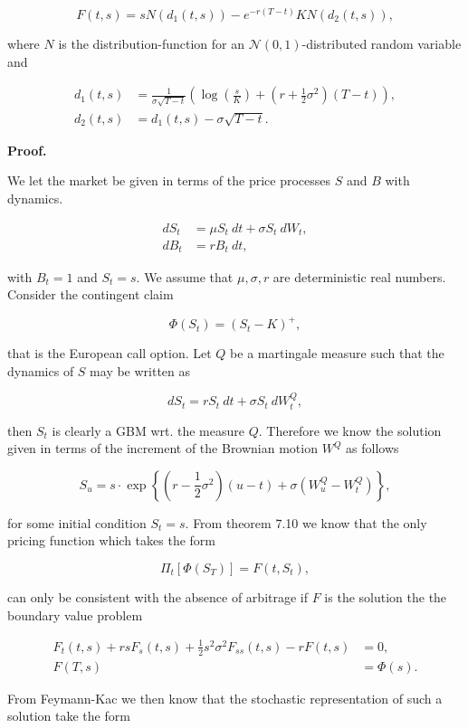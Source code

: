 \documentclass[
]{article}
\begin{document}
\[
F(t,s)=s N(d_1(t,s))-e^{-r(T-t)}KN(d_2(t,s)),\tag{7.52}
\]

where \(N\) is the distribution-function for an
\(\mathcal{N}(0,1)\)-distributed random variable and

\begin{align*}
d_1(t,s)&=\frac{1}{\sigma \sqrt{T-t}}\left(\log\left(\frac{s}{K}\right)+\left(r+\frac{1}{2}\sigma^2\right)(T-t)\right),\tag{7.53}\\
d_2(t,s)&=d_1(t,s)-\sigma\sqrt{T-t}.\tag{7.54}
\end{align*}

\textbf{Proof.}

We let the market be given in terms of the price processes \(S\) and
\(B\) with dynamics.

\begin{align*}
dS_t&=\mu S_t\ dt+\sigma S_t\ dW_t,\\
dB_t&=r B_t\ dt,
\end{align*}

with \(B_t=1\) and \(S_t=s\). We assume that \(\mu,\sigma, r\) are
deterministic real numbers. Consider the contingent claim

\[
\Phi(S_t)=\left( S_t - K\right)^+,
\]

that is the European call option. Let \(Q\) be a martingale measure such
that the dynamics of \(S\) may be written as

\[
dS_t=r S_t\ dt+\sigma S_t\ dW^Q_t,
\]

then \(S_t\) is clearly a GBM wrt. the measure \(Q\). Therefore we know
the solution given in terms of the increment of the Brownian motion
\(W^Q\) as follows

\[
S_u=s\cdot \exp\left\{\left(r-\frac{1}{2}\sigma^2\right)(u-t)+\sigma\left(W_u^Q-W_t^Q\right)\right\},
\]

for some initial condition \(S_t=s\). From theorem 7.10 we know that the
only pricing function which takes the form

\[
\Pi_t[\Phi(S_T)]=F(t,S_t),
\]

can only be consistent with the absence of arbitrage if \(F\) is the
solution the the boundary value problem

\begin{align*}
F_t(t,s)+rsF_s(t,s)+\frac{1}{2}s^2\sigma^2F_{ss}(t,s)-rF(t,s)&=0,\\
F(T,s)&=\Phi(s).
\end{align*}

From Feymann-Kac we then know that the stochastic representation of such
a solution take the form
\end{document}
